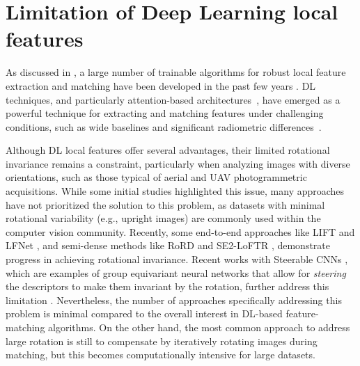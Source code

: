 
\section{Limitation of Deep Learning local features}\label{sec:5:limitation_dl_feats}

As discussed in , a large number of trainable algorithms for robust local feature extraction and matching have been developed in the past few years \citep{remondino2022_at_with_dl}.
DL techniques, and particularly attention-based architectures~\citep{vaswani2023attention}, have emerged as a powerful technique for extracting and matching features under challenging conditions, such as wide baselines and significant radiometric differences~\citep{jin_image_2021, Yao_2021}.

Although DL local features offer several advantages, their limited rotational invariance remains a constraint, particularly when analyzing images with diverse orientations, such as those typical of aerial and UAV photogrammetric acquisitions. 
While some initial studies highlighted this issue, many approaches have not prioritized the solution to this problem, as datasets with minimal rotational variability (e.g., upright images) are commonly used within the computer vision community. 
Recently, some end-to-end approaches like LIFT \citep{yi2016lift} and LFNet \citep{ono2018lfnet}, and semi-dense methods like RoRD \citep{parihar2022rord} and SE2-LoFTR \citep{Bkman2022_se2loftr}, demonstrate progress in achieving rotational invariance. 
Recent works with Steerable CNNs \citep{cohen2016steerable}, which are examples of group equivariant neural networks that allow for \textit{steering} the descriptors to make them invariant by the rotation, further address this limitation \cite{Bkman2022_se2loftr, bokman2023steerers}.
Nevertheless, the number of approaches specifically addressing this problem is minimal compared to the overall interest in DL-based feature-matching algorithms.
On the other hand, the most common approach to address large rotation is still to compensate by iteratively rotating images during matching, but this becomes computationally intensive for large datasets.

